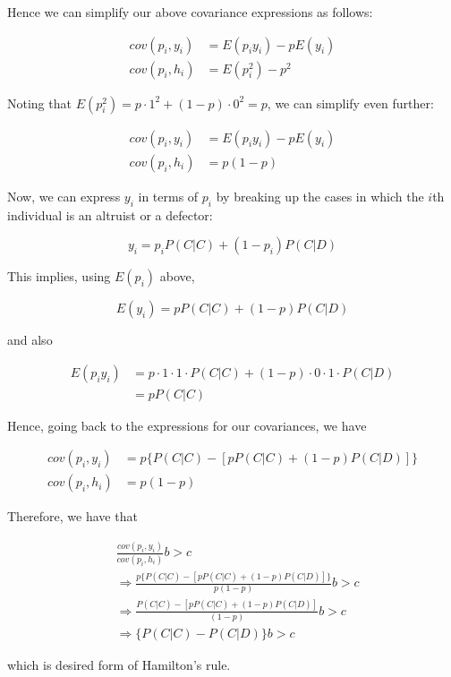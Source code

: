 \documentclass{article}
\begin{document}
Hence we can simplify our above covariance expressions as follows:

\begin{align*}
    cov(p_i, y_i) &= E(p_i y_i) - p E(y_i) \\
    cov(p_i, h_i) &= E(p_i^2) - p^2
\end{align*}

Noting that $E(p_i^2) = p \cdot 1^2 + (1 - p) \cdot 0^2 = p$, we can
simplify even further:

\begin{align*}
    cov(p_i, y_i) &= E(p_i y_i) - p E(y_i) \\
    cov(p_i, h_i) &= p (1 - p)
\end{align*}

Now, we can express $y_i$ in terms of $p_i$ by breaking up the cases in
which the $i$th individual is an altruist or a defector:

\begin{equation*}
    y_i = p_i P(C|C) + (1 - p_i) P(C|D)
\end{equation*}

This implies, using $E(p_i)$ above,

\begin{equation*}
    E(y_i) = p P(C|C) + (1 - p) P(C|D)
\end{equation*}

and also

\begin{align*}
    E(p_i y_i) &= p \cdot 1 \cdot 1 \cdot P(C|C) + (1 - p) \cdot 0 \cdot 1 \cdot P(C|D) \\
               &= p P(C|C)
\end{align*}

Hence, going back to the expressions for our covariances, we have

\begin{align*}
    cov(p_i, y_i) &= p \{P(C|C) - [p P(C|C) + (1 - p) P(C|D)]\} \\
    cov(p_i, h_i) &= p (1 - p)
\end{align*}

Therefore, we have that

\begin{align*}
    &\frac{cov(p_i, y_i)}{cov(p_i, h_i)} b > c \\
    &\Rightarrow \frac{p \{P(C|C) - [p P(C|C) + (1 - p) P(C|D)]\}}{p (1 - p)} b > c \\
    &\Rightarrow \frac{P(C|C) - [p P(C|C) + (1 - p) P(C|D)]}{(1 - p)} b > c \\
    &\Rightarrow \{P(C|C) - P(C|D)\} b > c
\end{align*}

which is desired form of Hamilton's rule.
\end{document}
